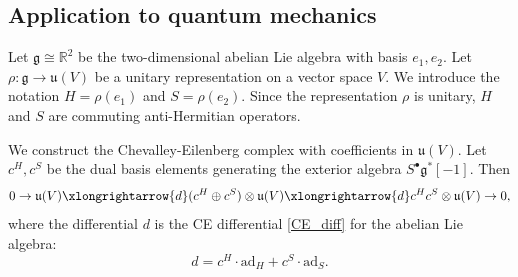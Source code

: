 \documentclass[10pt,a4paper]{amsart}
\theoremstyle{definition}
\begin{document}
\subsection{Application to quantum mechanics}
Let $\mathfrak{g}\cong\mathbb{R}^2$ be the two-dimensional abelian Lie algebra with basis $e_1,e_2$. Let $\rho:\mathfrak{g}\rightarrow \mathfrak{u}(V)$ be a unitary representation on a vector space $V$. We introduce the notation $H=\rho(e_1)$ and $S=\rho(e_2)$. Since the representation $\rho$ is unitary, $H$ and $S$ are commuting anti-Hermitian operators.

We construct the Chevalley-Eilenberg complex with coefficients in $\mathfrak{u}(V)$. Let $c^H,c^S$ be the dual basis elements generating the exterior algebra $S^{\bullet}\mathfrak{g}^*[-1]$. Then
\begin{equation}
\label{CE}
    0\rightarrow \mathfrak{u}(V)\xlongrightarrow{d}(c^H\oplus c^S)\otimes \mathfrak{u}(V) \xlongrightarrow{d} c^H c^S\otimes \mathfrak{u}(V)\rightarrow 0,
\end{equation}
where the differential $d$ is the CE differential \eqref{CE_diff} for the abelian Lie algebra:
\begin{equation}
\label{CE_diffab}
    d=c^{H}\cdot\mathrm{ad}_{H}+c^{S}\cdot\mathrm{ad}_{S}.
\end{equation}
\end{document}
